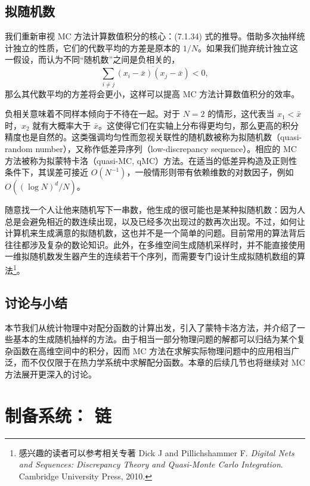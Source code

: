 \subsection{拟随机数}

我们重新审视 MC 方法计算数值积分的核心：(7.1.34) 式的推导。借助多次抽样统计独立的性质，它们的代数平均的方差是原本的 $1/N$。如果我们抛弃统计独立这一假设，而认为不同“随机数”之间是负相关的，
\begin{equation}
 \sum_{i\ne j}\overline{(x_i-\bar x)(x_j-\bar x)}<0,
\tag{7.1.43}
\end{equation}
那么其代数平均的方差将会更小，这样可以提高 MC 方法计算数值积分的效率。

负相关意味着不同样本倾向于不待在一起。对于 $N=2$ 的情形，这代表当 $x_1<\bar x$ 时，$x_2$ 就有大概率大于 $\bar x$。这使得它们在实轴上分布得更均匀，那么更高的积分精度也是自然的。这类强调均匀性而忽视关联性的随机数被称为拟随机数（quasi-random number），又称作低差异序列（low-discrepancy sequence）。相应的 MC 方法被称为拟蒙特卡洛（quasi-MC, qMC）方法。在适当的低差异构造及正则性条件下，其误差可接近 $O(N^{-1})$，一般情形则带有依赖维数的对数因子，例如 $O((\log N)^d/N)$。

随意找一个人让他来随机写下一串数，他生成的很可能也是某种拟随机数：因为人总是会避免相近的数连续出现，以及已经多次出现过的数再次出现。不过，如何让计算机来生成满意的拟随机数，这也并不是一个简单的问题。目前常用的算法背后往往都涉及复杂的数论知识。此外，在多维空间生成随机采样时，并不能直接使用一维拟随机数发生器产生的连续若干个序列，而需要专门设计生成拟随机数组的算法\footnote{感兴趣的读者可以参考相关专著 Dick J and Pillichshammer F. \emph{Digital Nets and Sequences: Discrepancy Theory and Quasi-Monte Carlo Integration}. Cambridge University Press, 2010.}。

\subsection{讨论与小结}

本节我们从统计物理中对配分函数的计算出发，引入了蒙特卡洛方法，并介绍了一些基本的生成随机抽样的方法。由于相当一部分物理问题的解都可以归结为某个复杂函数在高维空间中的积分，因而 MC 方法在求解实际物理问题中的应用相当广泛，而不仅仅限于在热力学系统中求解配分函数。本章的后续几节也将继续对 MC 方法展开更深入的讨论。

\section{制备系统： 链}

